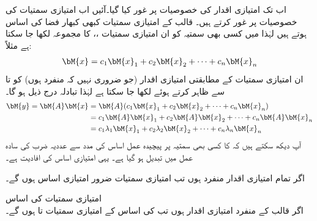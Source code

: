اب تک امتیازی اقدار کی خصوصیات پر غور کیا گیا۔آئیں اب امتیازی سمتیات کی خصوصیات پر غور کرتے ہیں۔ قالب  کے امتیازی سمتیات  کبھی  کبھار فضا  کی اساس ہوتے ہیں لہٰذا  میں کسی بھی سمتیہ  کو ان امتیازی سمتیات ،،  کا مجموعہ لکھا جا سکتا ہے مثلاً:
\begin{align}
\bM{x}=c_1\bM{x}_1+c_2\bM{x}_2+\cdots+c_n\bM{x}_n
\end{align}
ان امتیازی سمتیات کے مطابقتی امتیازی اقدار (جو ضروری نہیں کہ منفرد ہوں) کو  تا  سے ظاہر کرتے ہوئے
  لکھا جا سکتا ہے لہٰذا تبادلہ  درج ذیل ہو گا۔
\begin{gather}
\begin{aligned}
\bM{y}=\bM{A}\bM{x}&=\bM{A}(c_1\bM{x}_1+c_2\bM{x}_2+\cdots+c_n\bM{x}_n)\\
&=c_1\bM{A}\bM{x}_1+c_2\bM{A}\bM{x}_2+\cdots+c_n\bM{A}\bM{x}_n\\
&=c_1\lambda_1\bM{x}_1+c_2\lambda_2\bM{x}_2+\cdots+c_n\lambda_n\bM{x}_n
\end{aligned}
\end{gather}
آپ دیکھ سکتے ہیں کہ  کا کسی بھی سمتیہ  پر پیچیدہ عمل اساس کی مدد سے  عددیہ ضرب کی سادہ عمل میں تبدیل ہو گیا ہے۔ یہی امتیازی اساس کی افادیت ہے۔

اگر تمام امتیازی اقدار منفرد  ہوں تب امتیازی سمتیات ضرور امتیازی اساس ہوں گے۔

\quad امتیازی سمتیات کی اساس\\
اگر  قالب  کے  منفرد امتیازی اقدار ہوں تب  کی اساس  کے امتیازی سمتیات  تا  ہوں گے۔

